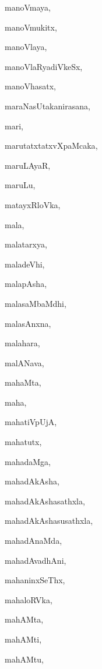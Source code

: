 \begin{multicols}{2}
{manoVmaya}, \pageref{manoVmaya}

{manoVmukitx}, \pageref{manoVmukitx}

{manoVlaya}, \pageref{manoVlaya}

{manoVlaRyadiVkeSx}, \pageref{manoVlaRyadiVkeSx}

{manoVhasatx}, \pageref{manoVhasatx}

{maraNasUtakanirasana}, \pageref{maraNasUtakanirasana}

{mari}, \pageref{mari}

{marutatxtatxvXpaMcaka}, \pageref{marutatxtatxvXpaMcaka}

{maruLAyaR}, \pageref{maruLAyaR}

{maruLu}, \pageref{maruLu}

{matayxRloVka}, \pageref{matayxRloVka}

{mala}, \pageref{mala}

{malatarxya}, \pageref{malatarxya}

{maladeVhi}, \pageref{maladeVhi}

{malapAsha}, \pageref{malapAsha}

{malasaMbaMdhi}, \pageref{malasaMbaMdhi}

{malasAnxna}, \pageref{malasAnxna}

{malahara}, \pageref{malahara}

{malANava}, \pageref{malANava}

{mahaMta}, \pageref{mahaMta}

{maha}, \pageref{maha}

{mahatiVpUjA}, \pageref{mahatiVpUjA}

{mahatutx}, \pageref{mahatutx}

{mahadaMga}, \pageref{mahadaMga}

{mahadAkAsha}, \pageref{mahadAkAsha}

{mahadAkAshasathxla}, \pageref{mahadAkAshasathxla}

{mahadAkAshasusathxla}, \pageref{mahadAkAshasusathxla}

{mahadAnaMda}, \pageref{mahadAnaMda}

{mahadAvadhAni}, \pageref{mahadAvadhAni}

{mahaninxSeThx}, \pageref{mahaninxSeThx}

{mahaloRVka}, \pageref{mahaloRVka}

{mahAMta}, \pageref{mahAMta}

{mahAMti}, \pageref{mahAMti}

{mahAMtu}, \pageref{mahAMtu}


\end{multicols}
